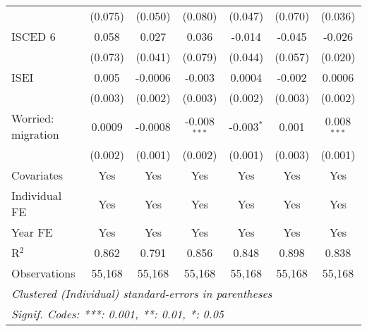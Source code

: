 \begin{table}[htbp]
\begin{tabular}{lcccccc}
                                        & (0.075)                & (0.050)                 & (0.080)                 & (0.047)                 & (0.070)                 & (0.036)\\   
      ISCED 6                           & 0.058                  & 0.027                   & 0.036                   & -0.014                  & -0.045                  & -0.026\\   
                                        & (0.073)                & (0.041)                 & (0.079)                 & (0.044)                 & (0.057)                 & (0.020)\\   
      ISEI                              & 0.005                  & -0.0006                 & -0.003                  & 0.0004                  & -0.002                  & 0.0006\\   
                                        & (0.003)                & (0.002)                 & (0.003)                 & (0.002)                 & (0.003)                 & (0.002)\\   
      Worried: migration                & 0.0009                 & -0.0008                 & -0.008$^{***}$          & -0.003$^{*}$            & 0.001                   & 0.008$^{***}$\\   
                                        & (0.002)                & (0.001)                 & (0.002)                 & (0.001)                 & (0.003)                 & (0.001)\\   
      Covariates                        & Yes                    & Yes                     & Yes                     & Yes                     & Yes                     & Yes\\  
      Individual FE                     & Yes                    & Yes                     & Yes                     & Yes                     & Yes                     & Yes\\  
      Year FE                           & Yes                    & Yes                     & Yes                     & Yes                     & Yes                     & Yes\\  
      R$^2$                             & 0.862                  & 0.791                   & 0.856                   & 0.848                   & 0.898                   & 0.838\\  
      Observations                      & 55,168                 & 55,168                  & 55,168                  & 55,168                  & 55,168                  & 55,168\\  
      \midrule \midrule
      \multicolumn{7}{l}{\emph{Clustered (Individual) standard-errors in parentheses}}\\
      \multicolumn{7}{l}{\emph{Signif. Codes: ***: 0.001, **: 0.01, *: 0.05}}\\
   \end{tabular}
\end{table}


